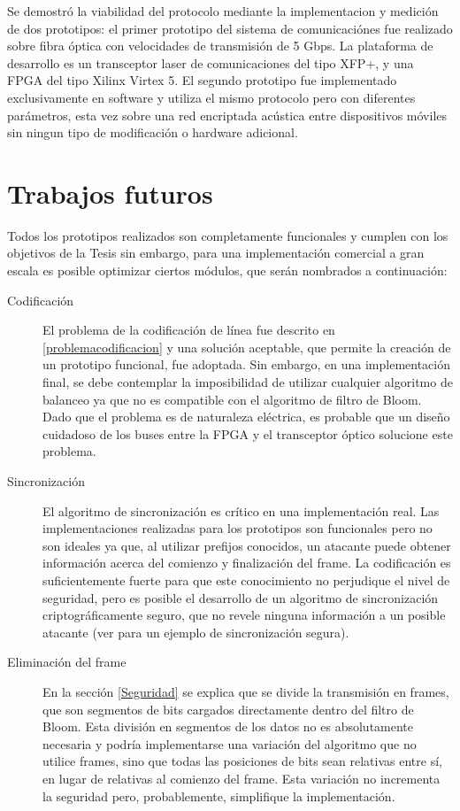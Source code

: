 
Se demostró la viabilidad del protocolo mediante la implementacion y medición de dos prototipos: el primer prototipo del sistema de comunicaciónes fue realizado sobre fibra óptica con velocidades de transmisión de 5 Gbps. La plataforma de desarrollo es un transceptor laser de comunicaciones del tipo XFP+, y una FPGA del tipo Xilinx Virtex 5.
El segundo prototipo fue implementado exclusivamente en software y utiliza el mismo protocolo pero con diferentes parámetros, esta vez sobre una red encriptada acústica entre dispositivos móviles sin ningun tipo de modificación o hardware adicional.

\section{Trabajos futuros}

Todos los prototipos realizados son completamente funcionales y cumplen con los objetivos de la Tesis sin embargo, para una implementación comercial a gran escala es posible optimizar ciertos módulos, que serán nombrados a continuación:
\begin{description}
 \item[Codificación] 
El problema de la codificación de línea fue descrito en \ref{problemacodificacion} y una solución aceptable, que permite la creación de un prototipo funcional, fue adoptada. Sin embargo, en una implementación final, se debe contemplar la imposibilidad de utilizar cualquier algoritmo de balanceo ya que no es compatible con el algoritmo de filtro de Bloom. Dado que el problema es de naturaleza eléctrica, es probable que un diseño cuidadoso de los buses entre la FPGA y el transceptor óptico solucione este problema.
 \item[Sincronización] 
 El algoritmo de sincronización es crítico en una implementación real. Las implementaciones realizadas para los prototipos son funcionales pero no son ideales ya que, al utilizar prefijos conocidos, un atacante puede obtener información acerca del comienzo y finalización del frame. La codificación es suficientemente fuerte para que este conocimiento no perjudique el nivel de seguridad, pero es posible el desarrollo de un algoritmo de sincronización criptográficamente seguro, que no revele ninguna información a un posible atacante (ver \cite{jung1999encryption} para un ejemplo de sincronización segura).
 \item[Eliminación del frame] 
 En la sección \ref{Seguridad} se explica que se divide la transmisión en frames, que son segmentos de bits cargados directamente dentro del filtro de Bloom. Esta división en segmentos de los datos no es absolutamente necesaria y podría implementarse una variación del algoritmo que no utilice frames, sino que todas las posiciones de bits sean relativas entre sí, en lugar de relativas al comienzo del frame. Esta variación no incrementa la seguridad pero, probablemente, simplifique la implementación.
 \item[] 
\end{description}

